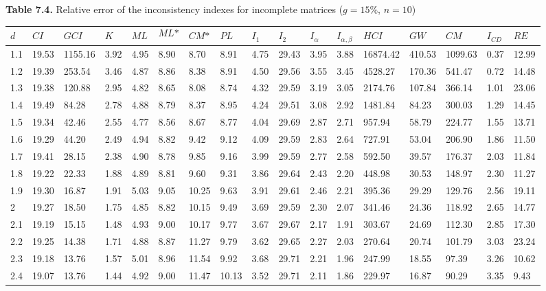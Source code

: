 \newpage
\textbf{Table 7.4.} Relative error of the inconsistency indexes for incomplete matrices ($g=15\%$, $n=10$)
\begin{adjustbox}{angle=90}
  \begin{center}
    \begin{tabular}{|l|llllllllllllllll|}
      \hline $d$ &
$\textit{CI}$&$\textit{GCI}$&$K$&$\textit{ML}$&$$\textit{ML*}$$&$\textit{CM*}$&$\textit{PL}$&$\textit{I}_1$&$\textit{I}_2$&$\textit{I}_{\alpha}$&$\textit{I}_{\alpha,\beta}$&$\textit{HCI}$&$\textit{GW}$&$\textit{CM}$&$\textit{I}_{CD}$&$\textit{RE}$\\ \hline \hline
1.1&19.53&1155.16&3.92&4.95&8.90&8.70&8.91&4.75&29.43&3.95&3.88&16874.42&410.53&1099.63&0.37&12.99  \\ 
1.2&19.39&253.54&3.46&4.87&8.86&8.38&8.91&4.50&29.56&3.55&3.45&4528.27&170.36&541.47&0.72&14.48  \\ 
1.3&19.38&120.88&2.95&4.82&8.65&8.08&8.74&4.32&29.59&3.19&3.05&2174.76&107.84&366.14&1.01&23.06  \\ 
1.4&19.49&84.28&2.78&4.88&8.79&8.37&8.95&4.24&29.51&3.08&2.92&1481.84&84.23&300.03&1.29&14.45  \\ 
1.5&19.34&42.46&2.55&4.77&8.56&8.67&8.77&4.04&29.69&2.87&2.71&957.94&58.79&224.77&1.55&13.71  \\ 
1.6&19.29&44.20&2.49&4.94&8.82&9.42&9.12&4.09&29.59&2.83&2.64&727.91&53.04&206.90&1.86&11.50  \\ 
1.7&19.41&28.15&2.38&4.90&8.78&9.85&9.16&3.99&29.59&2.77&2.58&592.50&39.57&176.37&2.03&11.84  \\ 
1.8&19.22&22.33&1.88&4.89&8.81&9.60&9.31&3.86&29.64&2.43&2.20&448.98&30.53&148.97&2.30&11.27  \\ 
1.9&19.30&16.87&1.91&5.03&9.05&10.25&9.63&3.91&29.61&2.46&2.21&395.36&29.29&129.76&2.56&19.11  \\ 
2&19.27&18.50&1.75&4.85&8.82&10.15&9.49&3.69&29.59&2.30&2.07&341.46&24.36&118.92&2.65&14.77  \\ 
2.1&19.19&15.15&1.48&4.93&9.00&10.17&9.77&3.67&29.67&2.17&1.91&303.67&24.69&112.30&2.85&17.30  \\ 
2.2&19.25&14.38&1.71&4.88&8.87&11.27&9.79&3.62&29.65&2.27&2.03&270.64&20.74&101.79&3.03&23.24  \\ 
2.3&19.18&13.76&1.57&5.01&8.96&11.54&9.92&3.68&29.71&2.21&1.96&247.99&18.55&97.39&3.26&10.62  \\ 
2.4&19.07&13.76&1.44&4.92&9.00&11.47&10.13&3.52&29.71&2.11&1.86&229.97&16.87&90.29&3.35&9.43  \\ 

\end{tabular}
\end{center}
\end{adjustbox}
